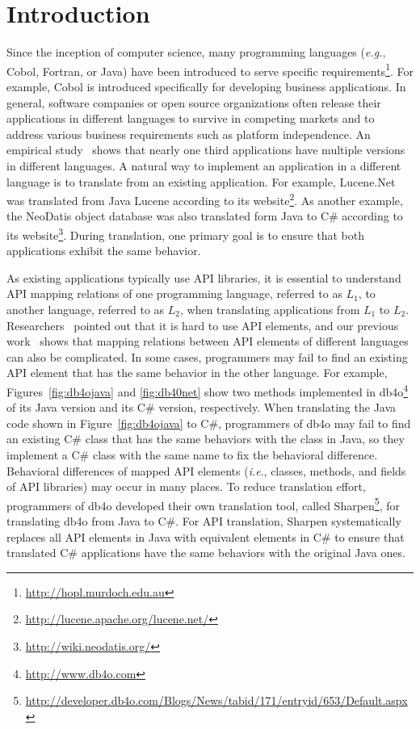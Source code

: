 \section{Introduction}
\label{sec:introduction}

Since the inception of computer science, many programming languages (\emph{e.g.}, Cobol, Fortran, or Java) have been introduced to serve specific requirements\footnote{\url{http://hopl.murdoch.edu.au}}. For example, Cobol is introduced specifically for developing business applications. In general, software companies or open source organizations often release their applications in different languages to survive in competing markets and to address various business requirements such as platform independence. An empirical study~\citep{jones1998estimating} shows that nearly one third applications have multiple versions in different languages. A natural way to implement an application in a different language is to translate from an existing application. For example, Lucene.Net was translated from Java Lucene according to its website\footnote{\url{http://lucene.apache.org/lucene.net/}}. As another example, the NeoDatis object database was also translated form Java to C\# according to its website\footnote{\url{http://wiki.neodatis.org/}}. During translation, one primary goal is to ensure that both applications exhibit the same behavior.

As existing applications typically use API libraries, it is essential to understand API mapping relations of one programming language, referred to as $L_1$, to another language, referred to as $L_2$, when translating applications from $L_1$ to $L_2$. Researchers~\citep{robillard2009makes,thomas2006api} pointed out that it is hard to use API elements, and our previous work~\citep{zhong2010mining} shows that mapping relations between API elements of different languages can also be complicated. In some cases, programmers may fail to find an existing API element that has the same behavior in the other language. For example, Figures~\ref{fig:db4ojava} and \ref{fig:db40net} show two methods implemented in db4o\footnote{\url{http://www.db4o.com}} of its Java version and its C\# version, respectively. When translating the Java code shown in Figure~\ref{fig:db4ojava} to C\#, programmers of db4o may fail to find an existing C\# class that has the same behaviors with the  class in Java, so they implement a C\# class with the same name to fix the behavioral difference. Behavioral differences of mapped API elements (\emph{i.e}., classes, methods, and fields of API libraries) may occur in many places. To reduce translation effort, programmers of db4o developed their own translation tool, called Sharpen\footnote{\url{http://developer.db4o.com/Blogs/News/tabid/171/entryid/653/Default.aspx}}, for translating db4o from Java to C\#. For API translation, Sharpen systematically replaces all API elements in Java with equivalent elements in C\# to ensure that translated C\# applications have the same behaviors with the original Java ones.

